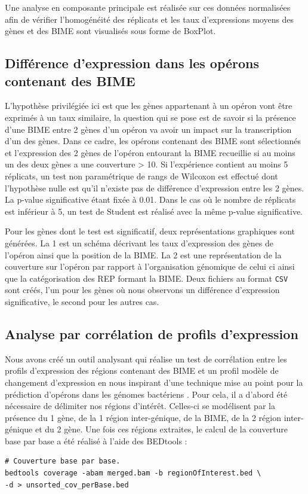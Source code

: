 \documentclass[12pt,a4paper]{report}
\begin{document}
\begin{onehalfspace}
Une analyse en composante principale est réalisée sur ces données normalisées afin de vérifier l'homogénéité des réplicats et les taux d'expressions moyens des gènes et des BIME sont visualisés sous forme de BoxPlot.

\subsection*{Différence d'expression dans les opérons contenant des BIME}
\label{subsec:expression}
L'hypothèse privilégiée ici est que les gènes appartenant à un opéron vont être exprimés à un taux similaire, la question qui se pose est de savoir si la présence d'une BIME entre 2 gènes d'un opéron va avoir un impact sur la transcription d'un des gènes. Dans ce cadre, les opérons contenant des BIME sont sélectionnés et l'expression des 2 gènes de l'opéron entourant la BIME recueillie si au moins un des deux gènes a une couverture > 10. Si l'expérience contient au moins 5 réplicats, un test non paramétrique de rangs de Wilcoxon est effectué dont l'hypothèse nulle est qu'il n'existe pas de différence d'expression entre les 2 gènes. La p-value significative étant fixée à 0.01. Dans le cas où le nombre de réplicats est inférieur à 5, un test de Student est réalisé avec la même p-value significative.

Pour les gènes dont le test est significatif, deux représentations graphiques sont générées. La 1 est un schéma décrivant les taux d'expression des gènes de l'opéron ainsi que la position de la BIME. La 2 est une représentation de la couverture sur l'opéron par rapport à l'organisation génomique de celui ci ainsi que la catégorisation des REP formant la BIME. Deux fichiers au format \texttt{CSV} sont créés, l'un pour les gènes où nous observons un différence d'expression significative, le second pour les autres cas.

\subsection*{Analyse par corrélation de profils d'expression}
Nous avons créé un outil analysant qui réalise un test de corrélation entre les profils d'expression des régions contenant des BIME et un profil modèle de changement d'expression en nous inspirant d'une technique mise au point pour la prédiction d'opérons dans les génomes bactériens \citep{Fortino2014}. Pour cela, il a d'abord été nécessaire de délimiter nos régions d'intérêt. Celles-ci se modélisent par la présence du 1 gène, de la 1 région inter-génique, de la BIME, de la 2 région inter-génique et du 2 gène. Une fois ces régions extraites, le calcul de la couverture base par base a été réalisé à l'aide des BEDtools :
\begin{lstlisting}[frame=single]
# Couverture base par base.
bedtools coverage -abam merged.bam -b regionOfInterest.bed \
-d > unsorted_cov_perBase.bed


\end{lstlisting}
\end{onehalfspace}
\end{document}
